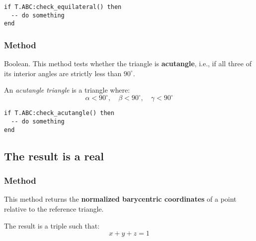 \begin{mybox}
\begin{verbatim}
if T.ABC:check_equilateral() then
  -- do something
end
\end{verbatim}
\end{mybox}

\vspace{1em}

\subsubsection{Method }
\label{ssub:_triangle_check__acutangle}

Boolean. This method tests whether the triangle is \textbf{acutangle}, i.e., if all three of its interior angles are strictly less than $90^\circ$.

\medskip
\noindent
An \emph{acutangle triangle} is a triangle where:
\[
\alpha < 90^\circ, \quad \beta < 90^\circ, \quad \gamma < 90^\circ
\]


\begin{mybox}
\begin{verbatim}
if T.ABC:check_acutangle() then
  -- do something
end
\end{verbatim}
\end{mybox}





\subsection{The result is a real}

\subsubsection{Method }
\label{ssub:_triangle_barycentric__coordinates_pt}

This method returns the \textbf{normalized barycentric coordinates} of a point relative to the reference triangle.

\begin{mybox}
\end{mybox}

\medskip
\noindent
The result is a triple  such that:
\[
x + y + z = 1
\]

